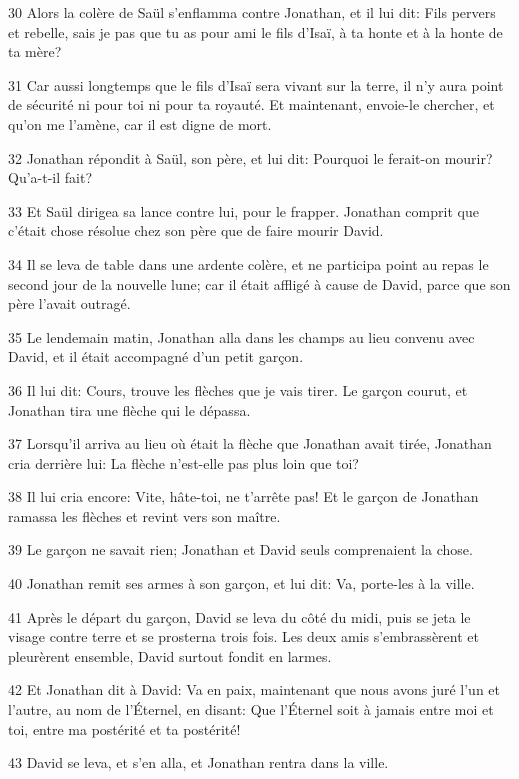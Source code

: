\par 30 Alors la colère de Saül s'enflamma contre Jonathan, et il lui dit: Fils pervers et rebelle, sais je pas que tu as pour ami le fils d'Isaï, à ta honte et à la honte de ta mère?
\par 31 Car aussi longtemps que le fils d'Isaï sera vivant sur la terre, il n'y aura point de sécurité ni pour toi ni pour ta royauté. Et maintenant, envoie-le chercher, et qu'on me l'amène, car il est digne de mort.
\par 32 Jonathan répondit à Saül, son père, et lui dit: Pourquoi le ferait-on mourir? Qu'a-t-il fait?
\par 33 Et Saül dirigea sa lance contre lui, pour le frapper. Jonathan comprit que c'était chose résolue chez son père que de faire mourir David.
\par 34 Il se leva de table dans une ardente colère, et ne participa point au repas le second jour de la nouvelle lune; car il était affligé à cause de David, parce que son père l'avait outragé.
\par 35 Le lendemain matin, Jonathan alla dans les champs au lieu convenu avec David, et il était accompagné d'un petit garçon.
\par 36 Il lui dit: Cours, trouve les flèches que je vais tirer. Le garçon courut, et Jonathan tira une flèche qui le dépassa.
\par 37 Lorsqu'il arriva au lieu où était la flèche que Jonathan avait tirée, Jonathan cria derrière lui: La flèche n'est-elle pas plus loin que toi?
\par 38 Il lui cria encore: Vite, hâte-toi, ne t'arrête pas! Et le garçon de Jonathan ramassa les flèches et revint vers son maître.
\par 39 Le garçon ne savait rien; Jonathan et David seuls comprenaient la chose.
\par 40 Jonathan remit ses armes à son garçon, et lui dit: Va, porte-les à la ville.
\par 41 Après le départ du garçon, David se leva du côté du midi, puis se jeta le visage contre terre et se prosterna trois fois. Les deux amis s'embrassèrent et pleurèrent ensemble, David surtout fondit en larmes.
\par 42 Et Jonathan dit à David: Va en paix, maintenant que nous avons juré l'un et l'autre, au nom de l'Éternel, en disant: Que l'Éternel soit à jamais entre moi et toi, entre ma postérité et ta postérité!
\par 43 David se leva, et s'en alla, et Jonathan rentra dans la ville.


